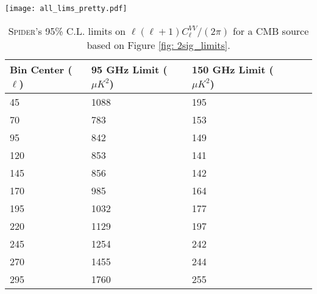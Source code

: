 \documentclass[twocolumn]{aastex61}
\begin{document}
\begin{figure*}
\begin{centering}
\texttt{[image: all\_lims\_pretty.pdf]}
\par
\end{centering}

\caption{\textsc{Spider}'s 95\% C.L. CMB circular polarization limits at 95 and 150 GHz. The MIPOL 33 GHz limit is also shown for comparison \citep{Mipol}.  \textsc{Spider}'s 150 GHz limit is stronger than the 95 GHz limit due to a combination of larger HWP circular polarization coupling and a larger number of detector channels and cross-spectra.  The numerical values of these limits are listed in Table \ref{table: limit_table}. Since the \textsc{Spider} limits assume a CMB source spectrum in the calculation of the $s$ parameters, these limits only apply to a thermal source.  When recalculated for $\nu^{-1}$ and $\nu^{-3}$ source spectra, the limits scale by 0.39 and 0.10 respectively at 95 GHz and 1.02 and 0.30 respectively at 150 GHz.  For synchrotron and thermal dust foreground models, these limits scale by 0.08 and 0.27 at 95 GHz and 0.11 and 0.56 at 150 GHz.}
\label{fig: 2sig_limits}
\end{figure*}

\begin{table}
\begin{center}
    \begin{tabular}{ *5l } 
    \toprule
    Bin Center ($\ell$) & 95 GHz Limit ($\mu K^2$) & 150 GHz Limit ($\mu K^2$) \\ \midrule
    45 & 1088 &	195 \\ 
    70 & 783  &	153 \\
    95 & 842  &	149 \\
    120 & 853  & 141 \\
    145 & 856  & 142 \\
    170 & 985  & 164 \\
    195 & 1032  & 177 \\ 
    220 & 1129  & 197 \\
    245 & 1254 & 242 \\
    270 & 1455 & 244 \\
    295 & 1760  & 255 \\
    \bottomrule
    \end{tabular}
    \caption{\textsc{Spider}'s 95\% C.L. limits on $\ell (\ell+1)C_{\ell}^{VV}/(2\pi)$ for a CMB source based on Figure \ref{fig: 2sig_limits}.}
    \label{table: limit_table}
\end{center}
\end{table}
\end{document}
